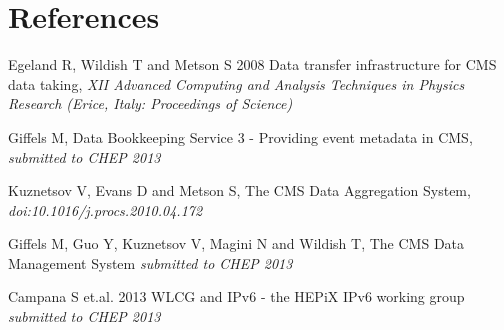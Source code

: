 \section*{References}

\begin{thebibliography}{1}
  Egeland R, Wildish T and Metson S 2008 Data transfer infrastructure for CMS data taking,  {\it XII Advanced Computing and Analysis Techniques in Physics Research (Erice, Italy: Proceedings of Science)}

Giffels M, Data Bookkeeping Service 3 - Providing event metadata in CMS, {\it submitted to CHEP 2013}

Kuznetsov V, Evans D and Metson S, The CMS Data Aggregation System,
{\it doi:10.1016/j.procs.2010.04.172}

Giffels M, Guo Y, Kuznetsov V, Magini N and Wildish T, The CMS Data Management System {\it submitted to CHEP 2013}


Campana S et.al. 2013 WLCG and IPv6 - the HEPiX IPv6 working group {\it submitted to CHEP 2013}
 
\end{thebibliography}
